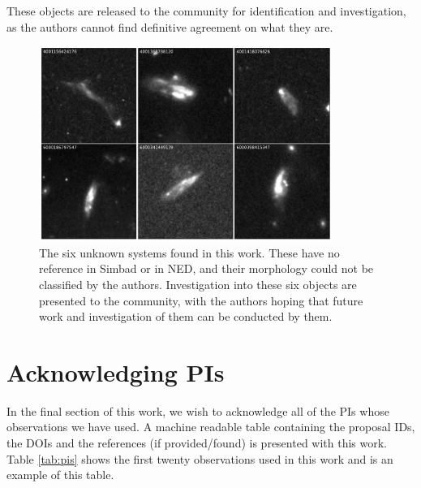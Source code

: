 These objects are released to the community for identification and investigation, as the authors cannot find definitive agreement on what they are. 

\begin{figure}
  \centering
  \includegraphics[width = 0.85\textwidth]{Chapter2/figures/fig17.pdf}
  \caption{The six unknown systems found in this work. These have no reference in Simbad or in NED, and their morphology could not be classified by the authors. Investigation into these six objects are presented to the community, with the authors hoping that future work and investigation of them can be conducted by them.}
  \label{fig:unknown-images}
\end{figure}

\section{Acknowledging PIs}
\noindent In the final section of this work, we wish to acknowledge all of the PIs whose observations we have used. A machine readable table containing the proposal IDs, the DOIs and the references (if provided/found) is presented with this work. Table \ref{tab:pis} shows the first twenty observations used in this work and is an example of this table.

